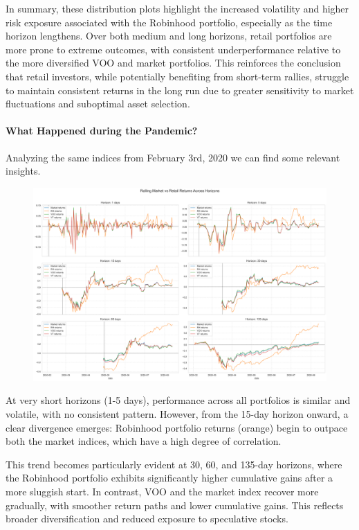 In summary, these distribution plots highlight the increased volatility and higher risk exposure associated with the Robinhood portfolio, especially as the time horizon lengthens. Over both medium and long horizons, retail portfolios are more prone to extreme outcomes, with consistent underperformance relative to the more diversified VOO and market portfolios. This reinforces the conclusion that retail investors, while potentially benefiting from short-term rallies, struggle to maintain consistent returns in the long run due to greater sensitivity to market fluctuations and suboptimal asset selection.
\paragraph{What Happened during the Pandemic?} Analyzing the same indices from February 3rd, 2020 we can find some relevant insights. 

\begin{figure}[h]
    \centering
    \includegraphics[width=1\linewidth]{../images/returns_comparison_pandemic.png}
\end{figure}
At very short horizons (1-5 days), performance across all portfolios is similar and volatile, with no consistent pattern. However, from the 15-day horizon onward, a clear divergence emerges: Robinhood portfolio returns (orange) begin to outpace both the market indices, which have a high degree of correlation.

This trend becomes particularly evident at 30, 60, and 135-day horizons, where the Robinhood portfolio exhibits significantly higher cumulative gains after a more sluggish start. 
In contrast, VOO and the market index recover more gradually, with smoother return paths and lower cumulative gains. This reflects broader diversification and reduced exposure to speculative stocks.

